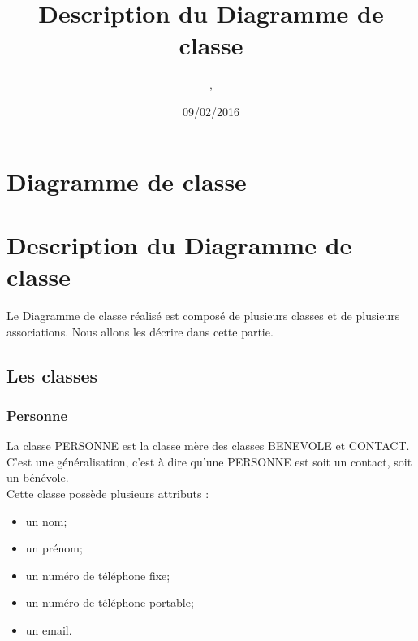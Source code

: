 \documentclass[asi, sansVersion]{picInsa}
\begin{document}
\title{Description du Diagramme de classe}
\author{\Mathieu, \Julie}
\date{09/02/2016} 

\maketitle

\tableofcontents

\chapter{Diagramme de classe}


\chapter{Description du Diagramme de classe}

Le Diagramme de classe réalisé est composé de plusieurs classes et de plusieurs associations. Nous allons les décrire dans cette partie. \\ 

\section{Les classes}

\subsection*{Personne}

La classe PERSONNE est la classe mère des classes BENEVOLE et CONTACT. C'est une généralisation, c'est à dire qu'une PERSONNE est soit un contact, soit un bénévole. \\
Cette classe possède plusieurs attributs : 
\begin{itemize}
\item un nom; %
\item un prénom; %
\item un numéro de téléphone fixe; %
\item un numéro de téléphone portable; %
\item un email. %
\end{itemize}
\end{document}
